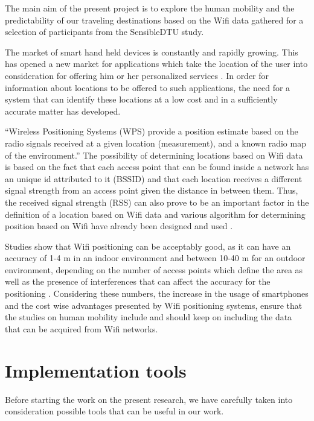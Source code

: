 The main aim of the present project is to explore the human mobility and the
predictability of our traveling destinations based on the Wifi data gathered for
a selection of participants from the SensibleDTU study.  

The market of smart hand held devices is constantly and rapidly growing. This
has opened a new market for applications which take the location of the user
into consideration for offering him or her personalized services \cite{alsehly2010improving}.
In order for information about locations to be offered to such applications, the need for
a system that can identify these locations at a low cost and in a sufficiently
accurate matter has developed. 

``Wireless Positioning Systems (WPS) provide a position estimate based on the
radio signals received at a given location (measurement), and a known radio map
of the environment.''\cite{athanasiou2009utilizing} The possibility of
determining locations based on Wifi data is based on the fact that each access
point that can be found inside a network has an unique id attributed to it
(BSSID) and that each location receives a different signal strength from an
access point given the distance in between them. Thus, the received signal
strength (RSS) can also prove to be an important factor in the definition of a
location based on Wifi data and various algorithm for determining position based
on Wifi have already been designed and used \cite{athanasiou2009utilizing}.

Studies show that Wifi positioning can be acceptably good, as it can have an
accuracy of 1-4 m in an indoor environment and between 10-40 m for an outdoor
environment, depending on the number of access points which define the area as
well as the presence of interferences that can affect the accuracy for the
positioning \cite{Cheng:2005:ACM:1067170.1067195} \cite{mok2007location}.
Considering these numbers, the increase in the usage of smartphones and
the cost wise advantages presented by Wifi positioning systems, ensure that the
studies on human mobility include and should keep on including the data that can
be acquired from Wifi networks.

\section{Implementation tools}
Before starting the work on the present research, we have carefully taken into
consideration possible tools that can be useful in our work.

